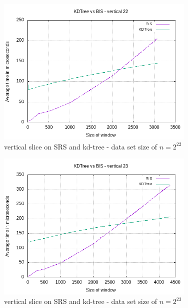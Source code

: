 \begin{figure}[h]
    \centering
    \includegraphics[width = 0.85\textwidth]{pictures/analysis/vert_22.png}
    \caption{vertical slice on SRS and kd-tree - data set size of $n=2^{22}$}\label{fig:vert_22}
\end{figure}

\begin{figure}[h]
    \centering
    \includegraphics[width = 0.85\textwidth]{pictures/analysis/vert_23.png}
    \caption{vertical slice on SRS and kd-tree - data set size of $n=2^{23}$}\label{fig:vert_23}
\end{figure}


